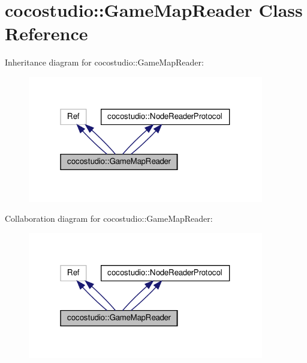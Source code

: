 \hypertarget{classcocostudio_1_1GameMapReader}{}\section{cocostudio\+:\+:Game\+Map\+Reader Class Reference}
\label{classcocostudio_1_1GameMapReader}


Inheritance diagram for cocostudio\+:\+:Game\+Map\+Reader\+:
\nopagebreak
\begin{figure}[H]
\begin{center}
\leavevmode
\includegraphics[width=292pt]{classcocostudio_1_1GameMapReader__inherit__graph}
\end{center}
\end{figure}


Collaboration diagram for cocostudio\+:\+:Game\+Map\+Reader\+:
\nopagebreak
\begin{figure}[H]
\begin{center}
\leavevmode
\includegraphics[width=292pt]{classcocostudio_1_1GameMapReader__coll__graph}
\end{center}
\end{figure}
